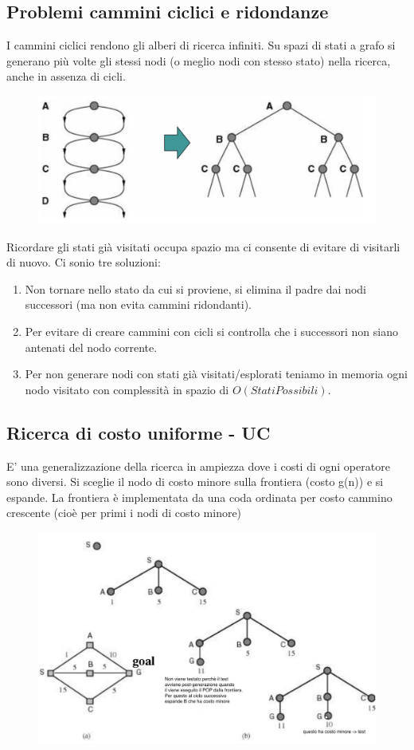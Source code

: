 \documentclass{article}
\begin{document}
\subsection{Problemi cammini ciclici e ridondanze}
I cammini ciclici rendono gli alberi di ricerca infiniti. Su spazi di stati a grafo si generano più volte gli stessi nodi (o meglio nodi con stesso stato) nella ricerca, anche in assenza di cicli.
\begin{figure}[H]
    \centering
    \includegraphics[scale=0.4]{Images/RidondanzeGrafi.png}
\end{figure}
Ricordare gli stati già visitati occupa spazio ma ci consente di evitare di visitarli di nuovo. Ci sonio tre soluzioni:
\begin{enumerate}
    \item Non tornare nello stato da cui si proviene, si elimina il padre dai nodi successori (ma non evita cammini ridondanti).
    \item Per evitare di creare cammini con cicli si controlla che i successori non siano antenati del nodo corrente.
    \item Per non generare nodi con stati già visitati/esplorati teniamo in memoria ogni nodo visitato con complessità in spazio di $O(StatiPossibili)$.
\end{enumerate}

\subsection{Ricerca di costo uniforme - UC}
E' una generalizzazione della ricerca in ampiezza dove i costi di ogni operatore sono diversi. Si sceglie il nodo di costo minore sulla frontiera (costo g(n)) e si espande. La frontiera è implementata da una coda ordinata per costo cammino crescente (cioè per primi i nodi di costo minore)
\begin{figure}[H]
    \centering
    \includegraphics[scale=0.8]{Images/UC.png}
\end{figure}
\end{document}
